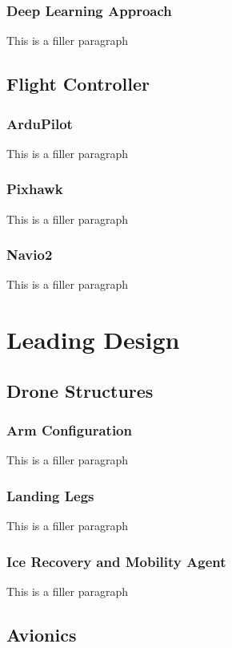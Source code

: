 		\subsubsection{Deep Learning Approach}
			This is a filler paragraph

	\subsection{Flight Controller}
		\subsubsection{ArduPilot}
			This is a filler paragraph

		\subsubsection{Pixhawk}
			This is a filler paragraph

		\subsubsection{Navio2}
			This is a filler paragraph

\section{Leading Design}\label{PL:Deployment:LeadingDesign}
	\subsection{Drone Structures}
		\subsubsection{Arm Configuration}
			This is a filler paragraph

		\subsubsection{Landing Legs}
			This is a filler paragraph
	
		\subsubsection{Ice Recovery and Mobility Agent}
			This is a filler paragraph

	\subsection{Avionics}
